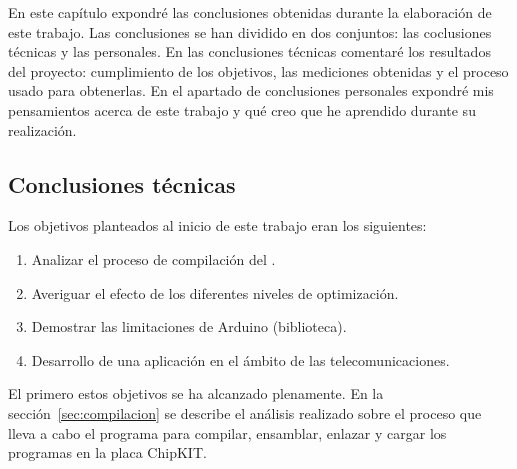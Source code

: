 En este capítulo expondré las conclusiones obtenidas durante la elaboración de este trabajo. Las conclusiones se han dividido en dos conjuntos: las coclusiones técnicas y las personales. En las  conclusiones técnicas comentaré los resultados del proyecto: cumplimiento de los objetivos, las mediciones obtenidas y el proceso usado para obtenerlas. En el apartado de conclusiones personales expondré mis pensamientos acerca de este trabajo y qué creo que he aprendido durante su realización.

\subsection{Conclusiones técnicas}

%
% 

Los objetivos planteados al inicio de este trabajo eran los siguientes:

\begin{enumerate}
    \item Analizar el proceso de compilación del .
    \item Averiguar el efecto de los diferentes niveles de optimización.
    \item Demostrar las limitaciones de Arduino (biblioteca).
    \item Desarrollo de una aplicación en el ámbito de las telecomunicaciones.
\end{enumerate}


El primero estos objetivos se ha alcanzado plenamente. En la sección~\ref{sec:compilacion} se describe el análisis realizado sobre el proceso que lleva a cabo el programa  para compilar, ensamblar, enlazar y cargar los programas en la placa ChipKIT.

